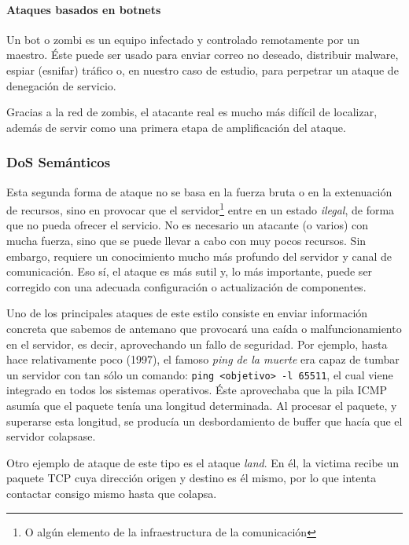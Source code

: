 \paragraph{Ataques basados en botnets}\mbox{\newline}

\noindent Un bot o zombi es un equipo infectado y controlado remotamente por un maestro. Éste puede ser usado para 
enviar correo no deseado, distribuir malware, espiar (esnifar) tráfico o, en nuestro caso de 
estudio, para perpetrar un ataque de denegación de servicio. 

Gracias a la red de zombis, el atacante real es mucho más difícil de localizar, además de servir como una primera etapa 
de amplificación del ataque.

\subsubsection{DoS Semánticos}
Esta segunda forma de ataque no se basa en la fuerza bruta o en la extenuación de recursos, sino en 
provocar que el servidor\footnote{O algún elemento de la infraestructura de la comunicación} entre en un estado 
\emph{ilegal}, de forma que no pueda ofrecer el servicio. No es necesario un atacante (o varios) con mucha fuerza, sino 
que se puede llevar a cabo con muy pocos recursos. Sin embargo, requiere un conocimiento mucho más profundo del 
servidor y canal de comunicación. Eso sí, el ataque es más sutil y, lo más importante, puede ser corregido con una 
adecuada configuración o actualización de componentes.
 
Uno de los principales ataques de este estilo consiste en enviar información concreta que sabemos de antemano que 
provocará una caída o malfuncionamiento en el servidor, es decir, aprovechando un fallo de seguridad. Por ejemplo, hasta 
hace relativamente poco (1997), el famoso \emph{ping de la muerte} \cite{Bidou} era capaz de 
tumbar un servidor con tan 
sólo un comando: \texttt{ping <objetivo>\ -l 65511}, el cual viene integrado en todos los sistemas operativos. Éste 
aprovechaba que la pila \gls{ICMP} asumía que el paquete tenía una longitud determinada. Al procesar el paquete, y superarse 
esta longitud, se producía un desbordamiento de buffer que hacía que el servidor colapsase.

Otro ejemplo de ataque de este tipo es el ataque \emph{land}. En él, la victima recibe un paquete 
\gls{TCP} cuya dirección origen y destino es él mismo, por lo que intenta contactar consigo mismo hasta que colapsa. 

